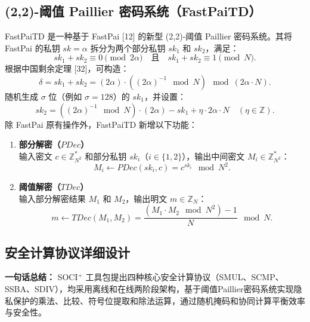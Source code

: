 \subsection{(2,2)-阈值 Paillier 密码系统（FastPaiTD）}
FastPaiTD 是一种基于 FastPai [12] 的新型 (2,2)-阈值 Paillier 密码系统。其将 FastPai 的私钥 \(sk = \alpha\) 拆分为两个部分私钥 \(sk_1\) 和 \(sk_2\)，满足：
\[
sk_1 + sk_2 \equiv 0 \pmod{2\alpha} \quad \text{且} \quad sk_1 + sk_2 \equiv 1 \pmod{N}.
\]
根据中国剩余定理 [32]，可构造：
\[
\delta = sk_1 + sk_2 = (2\alpha) \cdot ((2\alpha)^{-1} \mod N) \mod (2\alpha \cdot N).
\]
随机生成 \(\sigma\) 位（例如 \(\sigma=128\)）的 \(sk_1\)，并设置：
\[
sk_2 = ((2\alpha)^{-1} \mod N) \cdot (2\alpha) - sk_1 + \eta \cdot 2\alpha \cdot N \quad (\eta \in \mathbb{Z}).
\]
除 FastPai 原有操作外，FastPaiTD 新增以下功能：
\begin{enumerate}[leftmargin=*, nosep]
    \item \textbf{部分解密（\(PDec\)）}  \\
    输入密文 \(c \in \mathbb{Z}_{N^2}^*\) 和部分私钥 \(sk_i\)（\(i \in \{1,2\}\)），输出中间密文 \(M_i \in \mathbb{Z}_{N^2}^*\)：
    \[
    M_i \leftarrow PDec(sk_i, c) = c^{sk_i} \mod N^2. \tag{3}
    \]

    \item \textbf{阈值解密（\(TDec\)）}  \\
    输入部分解密结果 \(M_1\) 和 \(M_2\)，输出明文 \(m \in \mathbb{Z}_N\)：
    \[
    m \leftarrow TDec(M_1, M_2) = \frac{(M_1 \cdot M_2 \mod N^2) - 1}{N} \mod N. \tag{4}
    \]
\end{enumerate}

\subsection*{安全计算协议详细设计}
\textbf{一句话总结：}  
SOCI$^{+}$ 工具包提出四种核心安全计算协议（SMUL、SCMP、SSBA、SDIV），均采用离线和在线两阶段架构，基于阈值Paillier密码系统实现隐私保护的乘法、比较、符号位提取和除法运算，通过随机掩码和协同计算平衡效率与安全性。

